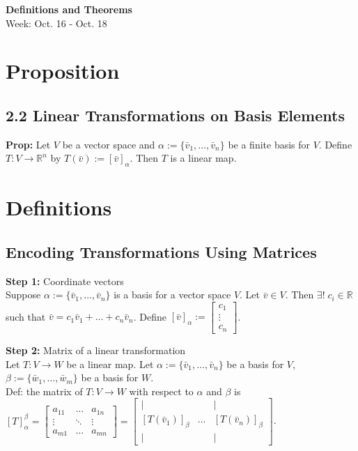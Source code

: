 \noindent
\textbf{\LARGE Definitions and Theorems} \\
\large Week: Oct. 16 - Oct. 18

\normalsize

\section*{Proposition}

\subsection*{2.2 Linear Transformations on Basis Elements}

\textbf{Prop:} Let $V$ be a vector space and $\alpha := \{\bar v_1, \ldots , \bar v_n \}$ be a finite basis for $V$. Define $T: V \rightarrow \mathbb{R}^n$ by $T(\bar v) := [\bar v]_\alpha$. Then $T$ is a linear map.

\section*{Definitions}
\subsection*{Encoding Transformations Using Matrices}

\textbf{Step 1:} Coordinate vectors \\
Suppose $\alpha := \{\bar v_1, \ldots, \bar v_n \}$ is a basis for a vector space $V$. Let $\bar v \in V$. Then $\exists ! \; c_i \in \mathbb{R}$ such that $\bar v = c_1 \bar v_1 + \ldots + c_n \bar v_n$.
Define $[\bar v]_\alpha := \begin{bmatrix}
    c_1 \\ \vdots \\ c_n
\end{bmatrix}$.

\bigskip 

\noindent
\textbf{Step 2:} Matrix of a linear transformation \\
Let $T: V \rightarrow W$ be a linear map. Let $\alpha := \{\bar v_1, \ldots , \bar v_n \}$ be a basis for $V$, $\beta := \{ \bar w_1, \ldots, \bar w_m \}$ be a basis for $W$. \\
Def: the matrix of $T: V \rightarrow W$ with respect to $\alpha$ and $\beta$ is \\
$[T]^\beta _\alpha = \begin{bmatrix}
    a_{11} & \ldots & a_{1n} \\
    \vdots & \ddots & \vdots \\
    a_{m1} & \ldots & a_{mn}
\end{bmatrix}
 = \begin{bmatrix}
     | &  & | \\
     [T(\bar v_1)]_\beta & \ldots & [T(\bar v_n)]_\beta \\
     | & & |
 \end{bmatrix}$.

